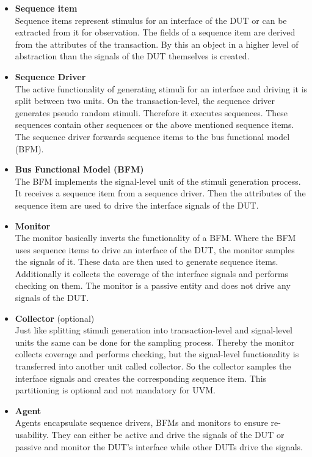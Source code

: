 \begin{itemize}
  \item \textbf{Sequence item}\\
  Sequence items represent stimulus for an interface of the DUT or can be extracted from it for observation.
  The fields of a sequence item are derived from the attributes of the transaction.
  By this an object in a higher level of abstraction than the signals of the DUT themselves is created.
  \item \textbf{Sequence Driver}\\
  The active functionality of generating stimuli for an interface and driving it is split between two units.
  On the transaction-level, the sequence driver generates pseudo random stimuli.
  Therefore it executes sequences.
  These sequences contain other sequences or the above mentioned sequence items. 
  The sequence driver forwards sequence items to the bus functional model (BFM).
  \item \textbf{Bus Functional Model (BFM)}\\
  The BFM implements the signal-level unit of the stimuli generation process.
  It receives a sequence item from a sequence driver. 
  Then the attributes of the sequence item are used to drive the interface signals of the DUT.
  \item \textbf{Monitor}\\
  The monitor basically inverts the functionality of a BFM. 
  Where the BFM uses sequence items to drive an interface of the DUT, the monitor samples the signals of it.
  These data are then used to generate sequence items.
  Additionally it collects the coverage of the interface signals and performs checking on them.
  The monitor is a passive entity and does not drive any signals of the DUT.
  \item \textbf{Collector} (optional)\\
  Just like splitting stimuli generation into transaction-level and signal-level units the same can be done for the sampling process. 
  Thereby the monitor collects coverage and performs checking, but the signal-level functionality is transferred into another unit called collector.
  So the collector samples the interface signals and creates the corresponding sequence item.
  This partitioning is optional and not mandatory for UVM.
  \item \textbf{Agent}\\
  Agents encapsulate sequence drivers, BFMs and monitors to ensure re-usability.
  They can either be active and drive the signals of the DUT or passive and monitor the DUT's interface while other DUTs drive the signals.

\end{itemize}

